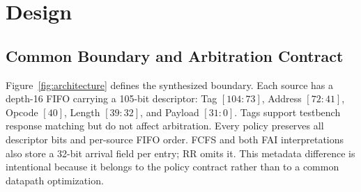 \section{Design}
\subsection{Common Boundary and Arbitration Contract}
Figure~\ref{fig:architecture} defines the synthesized boundary. Each source has a depth-16 FIFO carrying a 105-bit descriptor: Tag $[104{:}73]$, Address $[72{:}41]$, Opcode $[40]$, Length $[39{:}32]$, and Payload $[31{:}0]$. Tags support testbench response matching but do not affect arbitration. Every policy preserves all descriptor bits and per-source FIFO order. FCFS and both FAI interpretations also store a 32-bit arrival field per entry; RR omits it. This metadata difference is intentional because it belongs to the policy contract rather than to a common datapath optimization.

